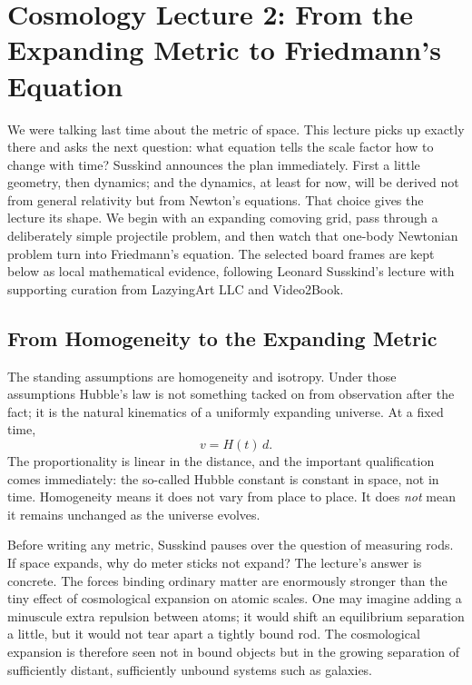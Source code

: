 \chapter{Cosmology Lecture 2: From the Expanding Metric to Friedmann's Equation}

We were talking last time about the metric of space. This lecture picks up exactly there and asks the next question: what equation tells the scale factor how to change with time? Susskind announces the plan immediately. First a little geometry, then dynamics; and the dynamics, at least for now, will be derived not from general relativity but from Newton's equations. That choice gives the lecture its shape. We begin with an expanding comoving grid, pass through a deliberately simple projectile problem, and then watch that one-body Newtonian problem turn into Friedmann's equation. The selected board frames are kept below as local mathematical evidence, following Leonard Susskind's lecture with supporting curation from LazyingArt LLC and Video2Book.

\section{From Homogeneity to the Expanding Metric}

The standing assumptions are homogeneity and isotropy. Under those assumptions Hubble's law is not something tacked on from observation after the fact; it is the natural kinematics of a uniformly expanding universe. At a fixed time,
\begin{equation}
v = H(t)\,d.
\end{equation}
The proportionality is linear in the distance, and the important qualification comes immediately: the so-called Hubble constant is constant in space, not in time. Homogeneity means it does not vary from place to place. It does \emph{not} mean it remains unchanged as the universe evolves.

Before writing any metric, Susskind pauses over the question of measuring rods. If space expands, why do meter sticks not expand? The lecture's answer is concrete. The forces binding ordinary matter are enormously stronger than the tiny effect of cosmological expansion on atomic scales. One may imagine adding a minuscule extra repulsion between atoms; it would shift an equilibrium separation a little, but it would not tear apart a tightly bound rod. The cosmological expansion is therefore seen not in bound objects but in the growing separation of sufficiently distant, sufficiently unbound systems such as galaxies.

